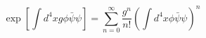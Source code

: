 \documentclass{standalone}
\begin{document}
            $$
            \exp\left[\int d^{4}x g\phi\bar{\psi}\psi\right]=\sum_{n=0}^{\infty}\frac{g^{n}}{n!}\left(\int d^{4}x\phi\bar{\psi}\psi\right)^{n}
            $$
            
\end{document}
